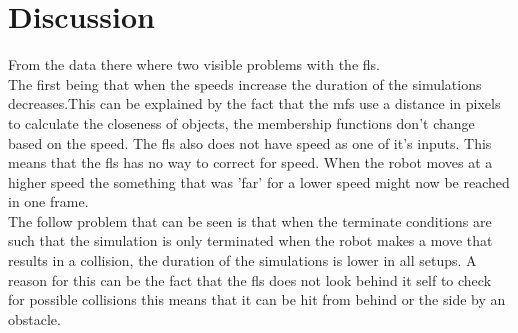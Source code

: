 \documentclass[conference]{IEEEtran}
\begin{document}
\section{Discussion}
From the data there where two visible problems with the fls.\\
The first being that when the speeds increase the duration of the simulations decreases.This can be explained by the fact that the mfs use a distance in pixels to calculate the closeness of objects, the membership functions don't change based on the speed. The fls also does not have speed as one of it's inputs. This means that the fls has no way to correct for speed. When the robot moves at a higher speed the something that was 'far' for a lower speed might now be reached in one frame.\\
The follow problem that can be seen is that when the terminate conditions are such that the simulation is only terminated when the robot makes a move that results in a collision, the duration of the simulations is lower in all setups. A reason for this can be the fact that the fls does not look behind it self to check for possible collisions this means that it can be hit from behind or the side by an obstacle.\\












\nocite{*}




\end{document}
